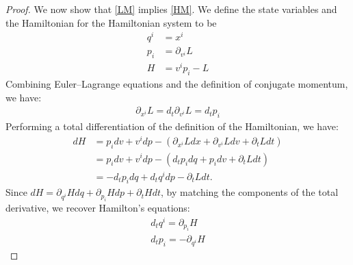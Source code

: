 \documentclass{techbrief}
\begin{document}
\begin{proof}
		
		We now show that \ref{LM} implies \ref{HM}. We define the state variables and the Hamiltonian for the Hamiltonian system to be
		\begin{equation}
			\begin{aligned}
				q^{i} &= x^{i} \\
				p_{i} &= \partial_{v^{i}}L \\
				H &= v^{i} p_{i} - L
			\end{aligned}
		\end{equation}
		Combining Euler--Lagrange equations and the definition of conjugate momentum, we have:
		\begin{equation}
			\begin{aligned}
				\partial_{x^{i}}L = d_{t}\partial_{v^{i}}L = d_{t}p_{i}
			\end{aligned}
		\end{equation}
		Performing a total differentiation of the definition of the Hamiltonian, we have:
		\begin{equation}
			\begin{aligned}
				dH &= p_{i}dv + v^{i}dp - (\partial_{x^{i}}Ldx + \partial_{v^{i}}Ldv + \partial_{t}Ldt) \\
				&= p_{i}dv + v^{i}dp - (d_{t}p_{i}dq + p_{i}dv + \partial_{t}Ldt) \\
				&= -d_{t}p_{i}dq + d_{t}q^{i}dp - \partial_{t}Ldt.
			\end{aligned}
		\end{equation}
		Since $dH = \partial_{q^{i}}Hdq + \partial_{p_{i}}Hdp + \partial_{t}Hdt$, by matching the components of the total derivative, we recover Hamilton's equations:
		\begin{equation}
			\begin{aligned}
				d_{t}q^{i} = \partial_{p_{i}}H \\
				d_{t}p_{i} = -\partial_{q^{i}}H
			\end{aligned}
		\end{equation}
		

\end{proof}
\end{document}
